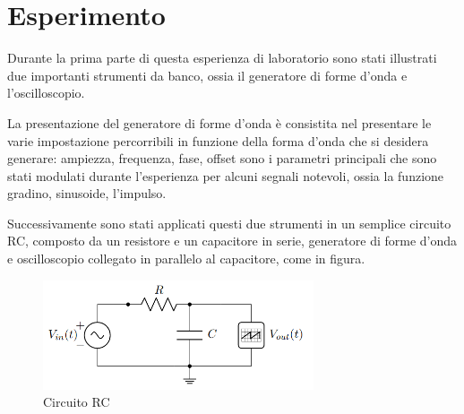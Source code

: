     \section{Esperimento}
    
    Durante la prima parte di questa esperienza di laboratorio sono stati illustrati due
    importanti strumenti da banco, ossia il generatore di forme d'onda e l'oscilloscopio. \par
    La presentazione del generatore di forme d'onda è consistita nel presentare le varie impostazione
    percorribili in funzione della forma d'onda che si desidera generare: ampiezza, frequenza, fase, offset
    sono i parametri principali che sono stati modulati durante l'esperienza per alcuni segnali notevoli,
    ossia la funzione gradino, sinusoide, l'impulso. \par
    Successivamente sono stati applicati questi due strumenti in un semplice circuito RC, composto da
    un resistore e un capacitore in serie, generatore di forme d'onda e oscilloscopio collegato in parallelo
    al capacitore, come in figura.

    \begin{figure}[!h]
        \begin{center}
            \includegraphics[width = 8cm]{circuito.png}
            \caption{Circuito RC}
        \end{center}
    \end{figure}
        
